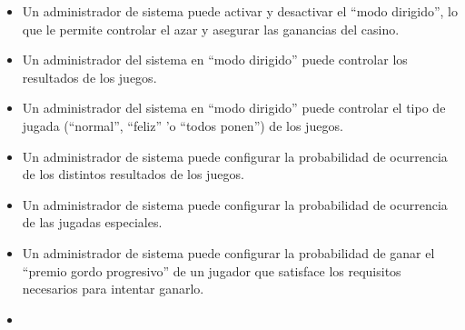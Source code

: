 \begin{itemize}

\item {} 

 Un administrador de sistema puede activar y desactivar el ``modo dirigido'', lo que le permite controlar el azar y asegurar las ganancias del casino.

\item {} 

 Un administrador del sistema en ``modo dirigido'' puede controlar los resultados de los juegos.

\item {}  

 Un administrador del sistema en ``modo dirigido'' puede controlar el tipo de jugada (``normal'', ``feliz'' 'o ``todos ponen'') de los juegos.

\item {} 

 Un administrador de sistema puede configurar la probabilidad de ocurrencia de los distintos resultados de los juegos.

\item {}  

 Un administrador de sistema puede configurar la probabilidad de ocurrencia de las jugadas especiales.

\item {} 

 Un administrador de sistema puede configurar la probabilidad de ganar el ``premio gordo progresivo'' de un jugador que satisface los requisitos necesarios para intentar ganarlo.

\item {} 


\end{itemize}
